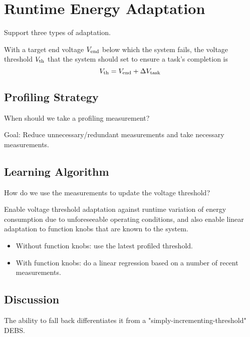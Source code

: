 \section{\nn{} Runtime Energy Adaptation} \label{sec:method2}


Support three types of adaptation.

With a target end voltage $V_{\text{end}}$ below which the system fails, the voltage threshold $V_{\text{th}}$ that the system should set to ensure a task's completion is
\begin{equation}
    V_{\text{th}} = V_{\text{end}} + \Delta V_{\text{task}}
\end{equation}

\subsection{Profiling Strategy}

When should we take a profiling measurement?

Goal: Reduce unnecessary/redundant measurements and take necessary measurements.

\subsection{Learning Algorithm}

How do we use the measurements to update the voltage threshold?

Enable voltage threshold adaptation against runtime variation of energy consumption due to unforeseeable operating conditions, and also enable linear adaptation to function knobs that are known to the system. 

\begin{itemize}
    \item Without function knobs: use the latest profiled threshold.
    \item With function knobs: do a linear regression based on a number of recent measurements. 
\end{itemize}

\subsection{Discussion}

The ability to fall back differentiates it from a "simply-incrementing-threshold" DEBS.
